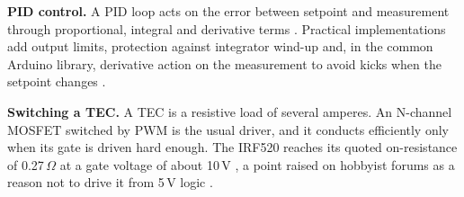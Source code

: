\documentclass[11pt,letterpaper]{article}
\begin{document}
\textbf{PID control.} A PID loop acts on the error between setpoint and measurement through proportional, integral and derivative terms \citep{astrom1995}. Practical implementations add output limits, protection against integrator wind-up and, in the common Arduino library, derivative action on the measurement to avoid kicks when the setpoint changes \citep{beauregard2011,dewesoft2024}.

\textbf{Switching a TEC.} A TEC is a resistive load of several amperes. An N-channel MOSFET switched by PWM is the usual driver, and it conducts efficiently only when its gate is driven hard enough. The IRF520 reaches its quoted on-resistance of 0.27\,$\Omega$ at a gate voltage of about 10\,V \citep{irf520}, a point raised on hobbyist forums as a reason not to drive it from 5\,V logic \citep{forum2021}.
\end{document}
